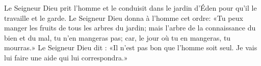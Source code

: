 Le Seigneur Dieu prit l’homme et le conduisit dans le jardin d’Éden
	pour qu’il le travaille et le garde.
Le Seigneur Dieu donna à l’homme cet ordre:
	«Tu peux manger les fruits de tous les arbres du jardin;
	mais l’arbre de la connaissance du bien et du mal, tu n’en mangeras pas;
	car, le jour où tu en mangeras, tu mourras.»
Le Seigneur Dieu dit : «Il n’est pas bon que l’homme soit seul.
	Je vais lui faire une aide qui lui correspondra.»
